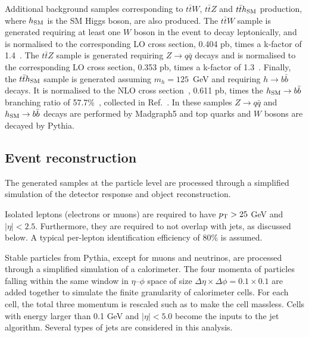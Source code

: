 \documentclass[preprintnumbers,superscriptaddress,nofootinbib,aps,prd,floatfix]{revtex4}
\newcommand{\pt}{p_{\rm{T}}}
\newcommand{\ttbar}{\ensuremath{t\bar{t}}}
\begin{document}
Additional background samples corresponding to $\ttbar W$, $\ttbar Z$ and $\ttbar h_{\rm SM}$ production, where $h_{\rm SM}$ is the SM Higgs boson,
are also produced. The $\ttbar W$ sample is generated requiring at least one $W$ boson in the event to decay leptonically,
and is normalised to the corresponding LO cross section, 0.404 pb, times a k-factor of 1.4~\cite{Garzelli:2012bn}.
The $\ttbar Z$ sample is generated requiring $Z \to q\bar{q}$ decays and is normalised
to the corresponding LO cross section, 0.353 pb, times a k-factor of 1.3~\cite{Garzelli:2012bn}.
Finally, the $\ttbar h_{\rm SM}$ sample is generated assuming $m_h=125$~GeV and requiring $h \to b\bar{b}$ decays.
It is normalised to the NLO cross section~\cite{Dawson:2003zu,Beenakker:2002nc,Beenakker:2001rj}, 0.611 pb, 
times the $h_{\rm SM} \to b\bar{b}$ branching ratio of 57.7\%~\cite{Djouadi:1997yw,Bredenstein:2006rh,Actis:2008ts,Denner:2011mq},
collected in Ref.~\cite{Dittmaier:2011ti}.
In these samples $Z \to q\bar{q}$ and $h_{\rm SM} \to b\bar{b}$ decays are performed by {\sc Madgraph5} and top quarks 
and $W$ bosons are decayed by {\sc Pythia}. 

\subsection{Event reconstruction}
\label{sec:event_reco}

The generated  samples at the particle level are processed through a simplified simulation of the detector
response and object reconstruction.

Isolated leptons (electrons or muons) are required to have $\pt>25$ GeV and $|\eta|<2.5$. Furthermore, they are required 
to not overlap with jets, as discussed below. A typical per-lepton identification efficiency of 80\% is assumed.

Stable particles from {\sc Pythia}, except for muons and neutrinos, are processed through a simplified
simulation of a calorimeter. The four momenta of particles falling within the same window in $\eta$--$\phi$ space of 
size $\Delta\eta \times \Delta\phi = 0.1\times 0.1$ are added together to simulate the finite granularity of
calorimeter cells. For each cell, the total three momentum is rescaled such as to make the cell massless.
Cells with energy larger than 0.1 GeV and $|\eta|<5.0$ become the inputs to the jet algorithm.
Several types of jets are considered in this analysis.
\end{document}

